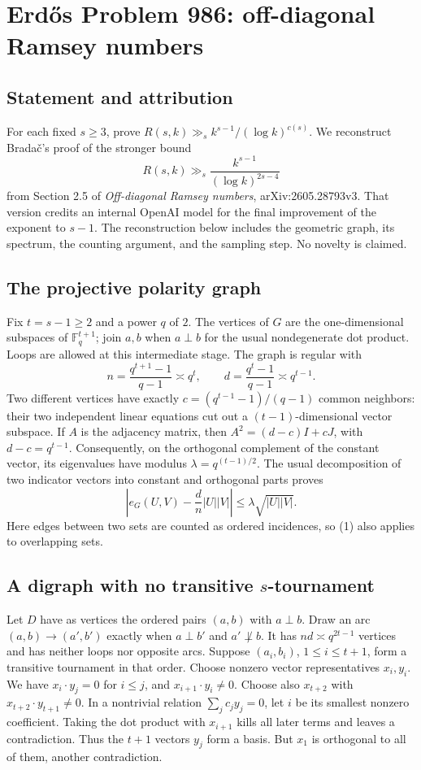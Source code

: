 \section*{Erd\H{o}s Problem 986: off-diagonal Ramsey numbers}
\subsection*{Statement and attribution}
For each fixed $s\ge3$, prove $R(s,k)\gg_s k^{s-1}/(\log k)^{c(s)}$.
We reconstruct Brada\v{c}'s proof of the stronger bound
\[
 R(s,k)\gg_s \frac{k^{s-1}}{(\log k)^{2s-4}}
\]
from Section 2.5 of \emph{Off-diagonal Ramsey numbers}, arXiv:2605.28793v3.
That version credits an internal OpenAI model for the final improvement of the exponent to $s-1$. The reconstruction below includes the geometric graph, its spectrum, the counting argument, and the sampling step. No novelty is claimed.

\subsection*{The projective polarity graph}
Fix $t=s-1\ge2$ and a power $q$ of $2$. The vertices of $G$ are the one-dimensional subspaces of $\mathbb F_q^{t+1}$; join $a,b$ when $a\perp b$ for the usual nondegenerate dot product. Loops are allowed at this intermediate stage. The graph is regular with
\[
 n=\frac{q^{t+1}-1}{q-1}\asymp q^t,\qquad
 d=\frac{q^t-1}{q-1}\asymp q^{t-1}.
\]
Two different vertices have exactly $c=(q^{t-1}-1)/(q-1)$ common neighbors: their two independent linear equations cut out a $(t-1)$-dimensional vector subspace. If $A$ is the adjacency matrix, then
$A^2=(d-c)I+cJ$, with $d-c=q^{t-1}$.
Consequently, on the orthogonal complement of the constant vector, its eigenvalues have modulus
$\lambda=q^{(t-1)/2}$. The usual decomposition of two indicator vectors into constant and orthogonal parts proves
\[
 \left|e_G(U,V)-\frac dn|U||V|\right|
 \le\lambda\sqrt{|U||V|}.
 \tag{1}
\]
Here edges between two sets are counted as ordered incidences, so (1) also applies to overlapping sets.

\subsection*{A digraph with no transitive $s$-tournament}
Let $D$ have as vertices the ordered pairs $(a,b)$ with $a\perp b$.
Draw an arc $(a,b)\to(a',b')$ exactly when $a\perp b'$ and $a'\not\perp b$.
It has $nd\asymp q^{2t-1}$ vertices and has neither loops nor opposite arcs.
Suppose $(a_i,b_i)$, $1\le i\le t+1$, form a transitive tournament in that order.
Choose nonzero vector representatives $x_i,y_i$. We have
$x_i\cdot y_j=0$ for $i\le j$, and $x_{i+1}\cdot y_i\ne0$.
Choose also $x_{t+2}$ with $x_{t+2}\cdot y_{t+1}\ne0$.
In a nontrivial relation $\sum_jc_jy_j=0$, let $i$ be its smallest nonzero coefficient. Taking the dot product with $x_{i+1}$ kills all later terms and leaves a contradiction.
Thus the $t+1$ vectors $y_j$ form a basis. But $x_1$ is orthogonal to all of them, another contradiction.

